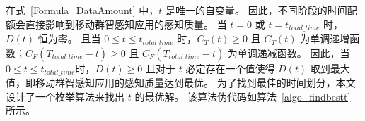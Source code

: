 在式~\eqref{Formula_DataAmount} 中，$t$ 是唯一的自变量。
因此，不同阶段的时间配额会直接影响到移动群智感知应用的感知质量。
当 $t=0$ 或 $t=t_{total\_time}$ 时，$D(t)$ 恒为零。
且当 $0 \leq t \leq t_{total\_time}$ 时，$C_T(t)\geq 0$ 且 $C_T(t)$ 为单调递增函数；$C_F(T_{total\_time}-t) \geq 0$ 且 $C_F(T_{total\_time}-t)$ 为单调递减函数。
因此，当$0 \leq t \leq t_{total\_time}$时，$D(t) \geq 0$ 且对于 $t$ 必定存在一个值使得 $D(t)$ 取到最大值，即移动群智感知应用的感知质量达到最优。
为了找到最佳的时间划分，本文设计了一个枚举算法来找出 $t$ 的最优解。
该算法伪代码如算法~\ref{algo_findbestt} 所示。


